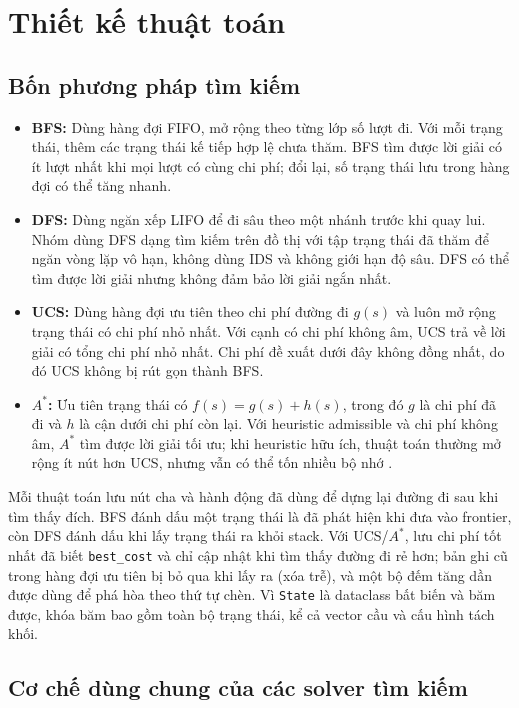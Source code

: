\section{Thiết kế thuật toán}

\subsection{Bốn phương pháp tìm kiếm}
\begin{itemize}
    \item \textbf{BFS:} Dùng hàng đợi FIFO, mở rộng theo từng lớp số lượt đi. Với mỗi trạng thái, thêm các trạng thái kế tiếp hợp lệ chưa thăm. BFS tìm được lời giải có ít lượt nhất khi mọi lượt có cùng chi phí; đổi lại, số trạng thái lưu trong hàng đợi có thể tăng nhanh.
    \item \textbf{DFS:} Dùng ngăn xếp LIFO để đi sâu theo một nhánh trước khi quay lui. Nhóm dùng DFS dạng tìm kiếm trên đồ thị với tập trạng thái đã thăm để ngăn vòng lặp vô hạn, không dùng IDS và không giới hạn độ sâu. DFS có thể tìm được lời giải nhưng không đảm bảo lời giải ngắn nhất.
    \item \textbf{UCS:} Dùng hàng đợi ưu tiên theo chi phí đường đi $g(s)$ và luôn mở rộng trạng thái có chi phí nhỏ nhất. Với cạnh có chi phí không âm, UCS trả về lời giải có tổng chi phí nhỏ nhất. Chi phí đề xuất dưới đây không đồng nhất, do đó UCS không bị rút gọn thành BFS.
    \item \textbf{$A^*$:} Ưu tiên trạng thái có $f(s)=g(s)+h(s)$, trong đó $g$ là chi phí đã đi và $h$ là cận dưới chi phí còn lại. Với heuristic admissible và chi phí không âm, $A^*$ tìm được lời giải tối ưu; khi heuristic hữu ích, thuật toán thường mở rộng ít nút hơn UCS, nhưng vẫn có thể tốn nhiều bộ nhớ \cite{hart1968formal,russell2020aima}.
\end{itemize}

Mỗi thuật toán lưu nút cha và hành động đã dùng để dựng lại đường đi sau khi tìm thấy đích. BFS đánh dấu một trạng thái là đã phát hiện khi đưa vào frontier, còn DFS đánh dấu khi lấy trạng thái ra khỏi stack. Với UCS/$A^*$, lưu chi phí tốt nhất đã biết \texttt{best\_cost} và chỉ cập nhật khi tìm thấy đường đi rẻ hơn; bản ghi cũ trong hàng đợi ưu tiên bị bỏ qua khi lấy ra (xóa trễ), và một bộ đếm tăng dần được dùng để phá hòa theo thứ tự chèn. Vì \texttt{State} là dataclass bất biến và băm được, khóa băm bao gồm toàn bộ trạng thái, kể cả vector cầu và cấu hình tách khối.

\subsection{Cơ chế dùng chung của các solver tìm kiếm}

